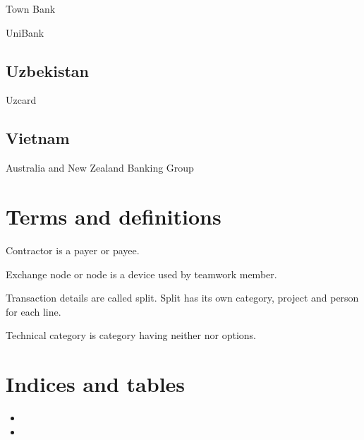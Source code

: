 \documentclass[a4paper,10pt,english]{sphinxmanual}
\begin{document}
\sphinxAtStartPar
Town Bank

\sphinxAtStartPar
UniBank


\section{Uzbekistan}
\label{\detokenize{banks:uzbekistan}}
\sphinxAtStartPar
Uzcard


\section{Vietnam}
\label{\detokenize{banks:vietnam}}
\sphinxAtStartPar
Australia and New Zealand Banking Group

\sphinxstepscope


\chapter{Terms and definitions}
\label{\detokenize{glossary:terms-and-definitions}}\label{\detokenize{glossary:chapter-index}}\label{\detokenize{glossary::doc}}\begin{description}
\sphinxAtStartPar
Contractor is a payer or payee.

\sphinxAtStartPar
Exchange node or node is a device used by teamwork member.

\sphinxAtStartPar
Transaction details are called split. Split has its own category, project and person for each line.

\sphinxAtStartPar
Technical category is category having neither  nor 
options.

\end{description}


\chapter{Indices and tables}
\label{\detokenize{index:indices-and-tables}}\begin{itemize}
\item {} 
\sphinxAtStartPar
{}

\item {} 
\sphinxAtStartPar
{}

\end{itemize}



\renewcommand{\indexname}{Index}
\printindex
\end{document}
